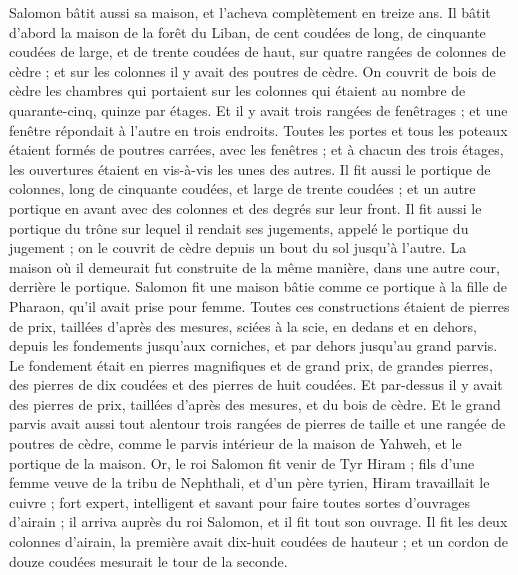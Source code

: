 \begin{multicols}{2}
\VerseOne{}Salomon bâtit aussi sa maison, et l'acheva complètement en treize ans.
Il bâtit d’abord la maison de la forêt du Liban, de cent coudées de long, de cinquante coudées de large, et de trente coudées de haut, sur quatre rangées de colonnes de cèdre ; et sur les colonnes il y avait des poutres de cèdre.
On couvrit de bois de cèdre les chambres qui portaient sur les colonnes qui étaient au nombre de quarante-cinq, quinze par étages.
Et il y avait trois rangées de fenêtrages ; et une fenêtre répondait à l'autre en trois endroits.
Toutes les portes et tous les poteaux étaient formés de poutres carrées, avec les fenêtres ; et à chacun des trois étages, les ouvertures étaient en vis-à-vis les unes des autres.
Il fit aussi le portique de colonnes, long de cinquante coudées, et large de trente coudées ; et un autre portique en avant avec des colonnes et des degrés sur leur front.
Il fit aussi le portique du trône sur lequel il rendait ses jugements, appelé le portique du jugement ; on le couvrit de cèdre depuis un bout du sol jusqu'à l'autre.
La maison où il demeurait fut construite de la même manière, dans une autre cour, derrière le portique. Salomon fit une maison bâtie comme ce portique à la fille de Pharaon, qu'il avait prise pour femme.
Toutes ces constructions étaient de pierres de prix, taillées d’après des mesures, sciées à la scie, en dedans et en dehors, depuis les fondements jusqu'aux corniches, et par dehors jusqu'au grand parvis.
Le fondement était en pierres magnifiques et de grand prix, de grandes pierres, des pierres de dix coudées et des pierres de huit coudées.
Et par-dessus il y avait des pierres de prix, taillées d’après des mesures, et du bois de cèdre.
Et le grand parvis avait aussi tout alentour trois rangées de pierres de taille et une rangée de poutres de cèdre, comme le parvis intérieur de la maison de Yahweh, et le portique de la maison.
Or, le roi Salomon fit venir de Tyr Hiram ;
fils d'une femme veuve de la tribu de Nephthali, et d’un père tyrien, Hiram travaillait le cuivre ; fort expert, intelligent et savant pour faire toutes sortes d'ouvrages d'airain ; il arriva auprès du roi Salomon, et il fit tout son ouvrage.
Il fit les deux colonnes d'airain, la première avait dix-huit coudées de hauteur ; et un cordon de douze coudées mesurait le tour de la seconde.

\end{multicols}
